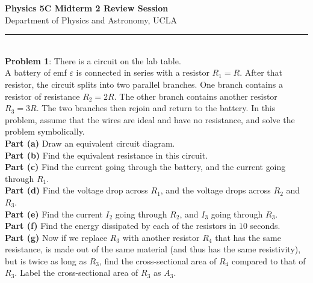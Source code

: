 \documentclass[11pt]{article}
\begin{document}
\Large \noindent \textbf{Physics 5C Midterm 2 Review Session}\\
\normalsize
Department of Physics and Astronomy, UCLA\\
\noindent\rule{8cm}{0.4pt}\\

\noindent\textbf{Problem 1}: There is a circuit on the lab table.\\

A battery of emf $\varepsilon$ is connected in series with a resistor $R_1=R$. After that resistor, the circuit splits into two parallel branches. One branch contains a resistor of resistance $R_2 = 2R$. The other branch contains another resistor $R_3 = 3R$. The two branches then rejoin and return to the battery. In this problem, assume that the wires are ideal and have no resistance, and solve the problem symbolically.\\

\noindent\textbf{Part (a)} Draw an equivalent circuit diagram. \\

\noindent\textbf{Part (b)} Find the equivalent resistance in this circuit.\\

\noindent\textbf{Part (c)} Find the current going through the battery, and the current going through $R_1$.\\ 

\noindent\textbf{Part (d)} Find the voltage drop across $R_1$, and the voltage drops across $R_2$ and $R_3$.\\

\noindent\textbf{Part (e)} Find the current $I_2$ going through $R_2$, and $I_3$ going through $R_3$.\\

\noindent\textbf{Part (f)} Find the energy dissipated by each of the resistors in $10$ seconds.\\

\noindent\textbf{Part (g)} Now if we replace $R_3$ with another resistor $R_4$ that has the same resistance, is made out of the same material (and thus has the same resistivity), but is twice as long as $R_3$, find the cross-sectional area of $R_4$ compared to that of $R_3$. Label the cross-sectional area of $R_3$ as $A_3$.\\
\end{document}
